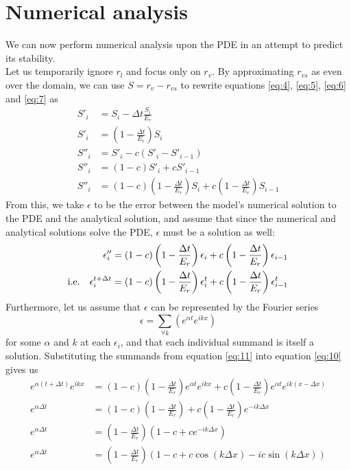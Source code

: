 \documentclass[11pt]{article}
\begin{document}
\section{Numerical analysis}
We can now perform numerical analysis upon the PDE in an attempt to predict its stability. \\
Let us temporarily ignore $r_l$ and focus only on $r_v$. By approximating $r_{vs}$ as even over the domain, we can use $S=r_v-r_{vs}$ to rewrite equations \ref{eq:4}, \ref{eq:5}, \ref{eq:6} and \ref{eq:7} as
\begin{align}
S'_i &= S_i - \Delta t\frac{S_i}{E_r}		\nonumber \\
S'_i &= \left(1-\frac{\Delta t}{E_r}\right)S_i	\nonumber \\
S''_i &= S'_i - c\left(S'_i - S'_{i-1}\right)		\nonumber \\
S''_i &= \left(1-c\right)S'_i + cS'_{i-1}		\nonumber \\
S''_i &= \left(1-c\right)\left(1-\frac{\Delta t}{E_r}\right)S_i + c\left(1-\frac{\Delta t}{E_r}\right)S_{i-1}	\label{eq:9}
\end{align}
From this, we take $\epsilon$ to be the error between the model's numerical solution to the PDE and the analytical solution, and assume that since the numerical and analytical solutions solve the PDE, $\epsilon$ must be a solution as well:
\begin{align} \nonumber
\epsilon''_i &= \left(1-c\right)\left(1-\frac{\Delta t}{E_r}\right)\epsilon_i + c\left(1-\frac{\Delta t}{E_r}\right)\epsilon_{i-1} \\
\label{eq:10} \text{i.e.\quad}
\epsilon^{t+\Delta t}_i &= \left(1-c\right)\left(1-\frac{\Delta t}{E_r}\right)\epsilon^t_i
+ c\left(1-\frac{\Delta t}{E_r}\right)\epsilon^t_{i-1}
\end{align}
Furthermore, let us assume that $\epsilon$ can be represented by the Fourier series
\begin{equation} \label{eq:11}
\epsilon = \sum_{\forall k}\left(e^{\alpha t}e^{ikx}\right)
\end{equation}
for some $\alpha$ and $k$ at each $\epsilon_i$, and that each individual summand is itself a solution. Substituting the summands from equation \ref{eq:11} into equation \ref{eq:10} gives us
\begin{align*}
e^{\alpha\left(t+\Delta t\right)}e^{ikx}
&= \left(1-c\right)\left(1-\frac{\Delta t}{E_r}\right)e^{\alpha t}e^{ikx}
+ c\left(1-\frac{\Delta t}{E_r}\right)e^{\alpha t}e^{ik\left(x-\Delta x\right)} \\
e^{\alpha\Delta t}
&= \left(1-c\right)\left(1-\frac{\Delta t}{E_r}\right)
+ c\left(1-\frac{\Delta t}{E_r}\right)e^{-ik\Delta x} \\
e^{\alpha\Delta t}
&= \left(1-\frac{\Delta t}{E_r}\right)\left(1-c+ce^{-ik\Delta x}\right) \\
e^{\alpha\Delta t}
&= \left(1-\frac{\Delta t}{E_r}\right)\left(1-c+c\cos\left(k\Delta x\right)-ic\sin\left(k\Delta x\right)\right)
\end{align*}
\end{document}
